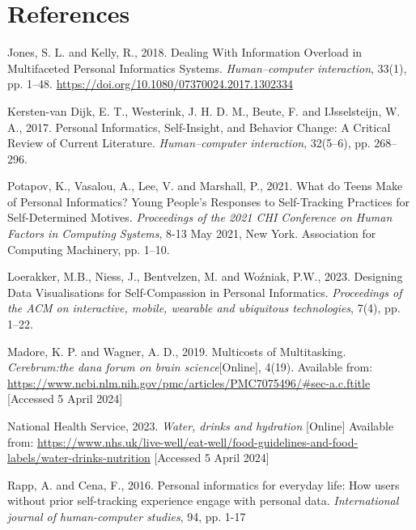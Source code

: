 \documentclass[12pt]{article}
\begin{document}
\section{References}

\renewcommand{\refname}{} 
\vspace{-20pt}
\begin{thebibliography}{99}
    Jones, S. L. and Kelly, R., 2018. 
    Dealing With Information Overload in Multifaceted Personal Informatics Systems. 
    \textit{Human–computer interaction}, 33(1), pp. 1–48. \url{https://doi.org/10.1080/07370024.2017.1302334}

    Kersten-van Dijk, E. T., Westerink, J. H. D. M., Beute, F. and 
    IJsselsteijn, W. A., 2017. 
    Personal Informatics, Self-Insight, and Behavior Change: A Critical Review of Current Literature. 
    \textit{Human–computer interaction}, 32(5–6), pp. 268–296.

    Potapov, K., Vasalou, A., Lee, V. and Marshall, P., 2021. 
    What do Teens Make of Personal Informatics? 
    Young People's Responses to Self-Tracking Practices for Self-Determined Motives. 
    \textit{Proceedings of the 2021 CHI Conference on Human Factors in Computing Systems}, 
    8-13 May 2021, New York. Association for Computing Machinery, pp. 1–10.

    Loerakker, M.B., Niess, J., Bentvelzen, M. and Woźniak, P.W., 2023. 
    Designing Data Visualisations for Self-Compassion in Personal Informatics. 
    \textit{Proceedings of the ACM on interactive, mobile, wearable and ubiquitous technologies}, 7(4), pp. 1–22.

    Madore, K. P. and Wagner, A. D., 2019. Multicosts of Multitasking. 
    \textit{Cerebrum:the dana forum on brain science}[Online], 4(19). Available from:
    \url{https://www.ncbi.nlm.nih.gov/pmc/articles/PMC7075496/#sec-a.c.ftitle} 
    [Accessed 5 April 2024]

    National Health Service, 2023. \textit{Water, drinks and hydration} [Online] 
    Available from: 
    \url{https://www.nhs.uk/live-well/eat-well/food-guidelines-and-food-labels/water-drinks-nutrition} 
    [Accessed 5 April 2024]
    
    Rapp, A. and Cena, F., 2016. Personal informatics for everyday life: 
    How users without prior self-tracking experience engage with personal data. 
    \textit{International journal of human-computer studies}, 94, pp. 1-17


\end{thebibliography}
\end{document}
